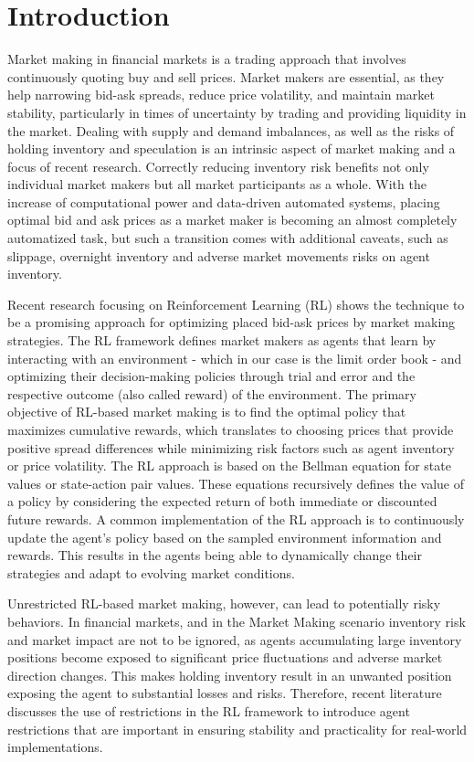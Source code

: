 \section{Introduction}

Market making in financial markets is a trading approach that involves continuously quoting buy and sell prices. Market makers are essential, as they help narrowing bid-ask spreads, reduce price volatility, and maintain market stability, particularly in times of uncertainty by trading and providing liquidity in the market. Dealing with supply and demand imbalances, as well as the risks of holding inventory and speculation is an intrinsic aspect of market making and a focus of recent research. Correctly reducing inventory risk benefits not only individual market makers but all market participants as a whole. With the increase of computational power and data-driven automated systems, placing optimal bid and ask prices as a market maker is becoming an almost completely automatized task, but such a transition comes with additional caveats, such as slippage, overnight inventory and adverse market movements risks on agent inventory. 

Recent research focusing on Reinforcement Learning (RL) shows the technique to be a promising approach for optimizing placed bid-ask prices by market making strategies. The RL framework defines market makers as agents that learn by interacting with an environment - which in our case is the limit order book - and optimizing their decision-making policies through trial and error and the respective outcome (also called reward) of the environment. The primary objective of RL-based market making is to find the optimal policy that maximizes cumulative rewards, which translates to choosing prices that provide positive spread differences while minimizing risk factors such as agent inventory or price volatility. The RL approach is based on the Bellman equation for state values or state-action pair values. These equations recursively defines the value of a policy by considering the expected return of both immediate or discounted future rewards. A common implementation of the RL approach is to continuously update the agent's policy based on the sampled environment information and rewards. This results in the agents being able to dynamically change their strategies and adapt to evolving market conditions. 

Unrestricted RL-based market making, however, can lead to potentially risky behaviors. In financial markets, and in the Market Making scenario inventory risk and market impact are not to be ignored, as agents accumulating large inventory positions become exposed to significant price fluctuations and adverse market direction changes. This makes holding inventory result in an unwanted position exposing the agent to substantial losses and risks. Therefore, recent literature discusses the use of restrictions in the RL framework to introduce agent restrictions that are important in ensuring stability and practicality for real-world implementations. 

